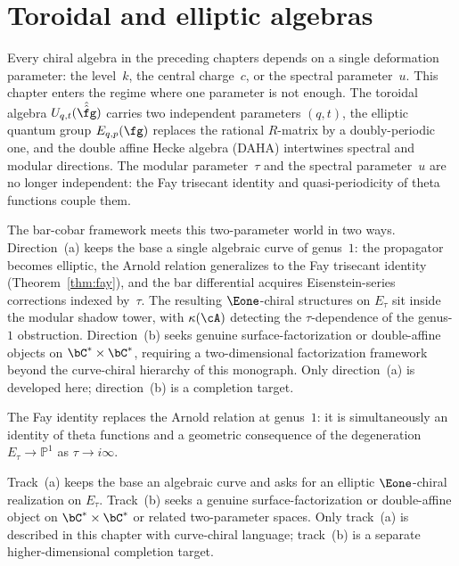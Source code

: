 
\chapter{Toroidal and elliptic algebras}
\label{chap:toroidal-elliptic}

Every chiral algebra in the preceding chapters depends on a single
deformation parameter: the level~$k$, the
central charge~$c$, or the spectral
parameter~$u$. This chapter enters the regime where one
parameter is not enough. The toroidal algebra
$U_{q,t}(\hat{\hat{\fg}})$ carries two independent parameters $(q,t)$,
the elliptic quantum group $E_{q,p}(\fg)$ replaces the rational
$R$-matrix by a doubly-periodic one, and the double affine Hecke
algebra (DAHA) intertwines spectral and modular directions. The modular parameter~$\tau$ and the
spectral parameter~$u$ are no longer independent:
the Fay trisecant identity and quasi-periodicity
of theta functions couple them.

The bar-cobar framework meets this two-parameter world in two ways.
Direction~(a) keeps the base a single algebraic curve of
genus~$1$: the propagator becomes elliptic, the Arnold relation
generalizes to the Fay trisecant identity
(Theorem~\ref{thm:fay}), and the bar differential acquires
Eisenstein-series corrections indexed by~$\tau$. The resulting
$\Eone$-chiral structures on $E_\tau$ sit inside the modular shadow
tower, with $\kappa(\cA)$ detecting the
$\tau$-dependence of the genus-$1$ obstruction. Direction~(b)
seeks genuine surface-factorization or double-affine objects on
$\bC^* \times \bC^*$, requiring a two-dimensional factorization
framework beyond the curve-chiral hierarchy of this
monograph. Only direction~(a) is developed here; direction~(b) is
a completion target.

The Fay identity replaces the Arnold relation at genus~$1$:
it is simultaneously an identity of theta functions and a geometric consequence of
the degeneration $E_\tau \to \mathbb{P}^1$ as $\tau \to i\infty$.

\begin{remark}
\label{rem:toroidal-two-tracks}
Track~(a) keeps the base an algebraic curve and asks for an elliptic
$\Eone$-chiral realization on $E_\tau$. Track~(b) seeks a genuine
surface-factorization or double-affine object on
$\bC^* \times \bC^*$ or related two-parameter spaces. Only
track~(a) is described in this chapter with curve-chiral language;
track~(b) is a separate higher-dimensional completion target.
\end{remark}

